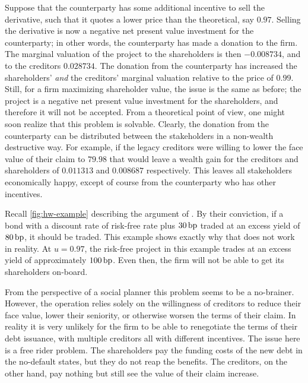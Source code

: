 \documentclass[main.tex]{subfiles}
\begin{document}
        Suppose that the counterparty has some additional incentive to sell the derivative,
        such that it quotes a lower price than the theoretical, say $\num{0.97}$.
        Selling the derivative is now a negative net present value investment for the counterparty;
        in other words, the counterparty has made a donation to the firm. 
        The marginal valuation of the project to the shareholders is then $\num{-0.008734}$,
        and to the creditors $\num{0.028734}$.
        The donation from the counterparty has increased the shareholders' 
        \textit{and} the creditors' marginal valuation relative to the price of $\num{0.99}$.
        Still, for a firm maximizing shareholder value, the issue is the same as before;
        the project is a negative net present value investment for the shareholders,
        and therefore it will not be accepted.
        From a theoretical point of view, one might soon realize that this problem is solvable.
        Clearly, the donation from the counterparty can be distributed between the 
        stakeholders in a non-wealth destructive way. 
        For example, if the legacy creditors were willing to lower the face value of their claim
        to $\num{79.98}$ that would leave a wealth gain for the creditors and shareholders
        of $\num{0.011313}$ and $\num{0.008687}$ respectively.
        This leaves all stakeholders economically happy, 
        except of course from the counterparty who has other incentives.

        Recall \cref{fig:hw-example} describing the argument of \textcite{HullWhite2012FVA}.
        By their conviction, if a bond with a discount rate of risk-free rate plus $30\,\text{bp}$ 
        traded at an excess yield of $80\,\text{bp}$, it should be traded. 
        This example shows exactly why that does not work in reality.
        At $u=\num{0.97}$, the risk-free project in this example trades at 
        an excess yield of approximately $100\,\text{bp}$.
        Even then, the firm will not be able to get its shareholders on-board.

        From the perspective of a social planner this problem seems to be a no-brainer. 
        However, the operation relies solely on the willingness of creditors to 
        reduce their face value, lower their seniority, or otherwise worsen the terms of their claim.
        In reality it is very unlikely for the firm to be able to renegotiate 
        the terms of their debt issuance, with multiple creditors all with different incentives.
        The issue here is a free rider problem. 
        The shareholders pay the funding costs of the new debt in the no-default states,
        but they do not reap the benefits.
        The creditors, on the other hand, pay nothing 
        but still see the value of their claim increase.
\end{document}
